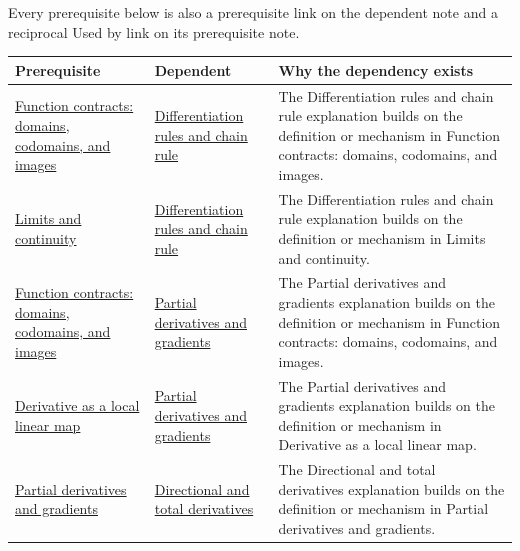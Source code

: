 Every prerequisite below is also a prerequisite link on the dependent note and a reciprocal Used by link on its prerequisite note.

{\def\LTcaptype{none} %
\begin{longtable}[]{@{}
  >{\raggedright\arraybackslash}p{}
  >{\raggedright\arraybackslash}p{}
  >{\raggedright\arraybackslash}p{}@{}}
\toprule\noalign{}
\begin{minipage}[b]{\linewidth}\raggedright
Prerequisite
\end{minipage} & \begin{minipage}[b]{\linewidth}\raggedright
Dependent
\end{minipage} & \begin{minipage}[b]{\linewidth}\raggedright
Why the dependency exists
\end{minipage} \\
\midrule\noalign{}
\endhead
\bottomrule\noalign{}
\endlastfoot
\hyperref[appendix-a59658325cd6]{Function contracts: domains, codomains, and images} & \hyperref[appendix-d9f70bdfbc92]{Differentiation rules and chain rule} & The Differentiation rules and chain rule explanation builds on the definition or mechanism in Function contracts: domains, codomains, and images. \\
\hyperref[appendix-fecc1847f5a3]{Limits and continuity} & \hyperref[appendix-d9f70bdfbc92]{Differentiation rules and chain rule} & The Differentiation rules and chain rule explanation builds on the definition or mechanism in Limits and continuity. \\
\hyperref[appendix-a59658325cd6]{Function contracts: domains, codomains, and images} & \hyperref[appendix-677b59746ae0]{Partial derivatives and gradients} & The Partial derivatives and gradients explanation builds on the definition or mechanism in Function contracts: domains, codomains, and images. \\
\hyperref[appendix-7bc181935c42]{Derivative as a local linear map} & \hyperref[appendix-677b59746ae0]{Partial derivatives and gradients} & The Partial derivatives and gradients explanation builds on the definition or mechanism in Derivative as a local linear map. \\
\hyperref[appendix-677b59746ae0]{Partial derivatives and gradients} & \hyperref[appendix-e2d476574aab]{Directional and total derivatives} & The Directional and total derivatives explanation builds on the definition or mechanism in Partial derivatives and gradients. \\

\end{longtable}}
